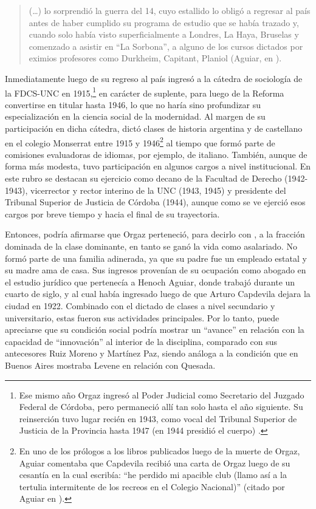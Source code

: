 \begin{quote}
(\dots) lo sorprendió la guerra del 14, cuyo estallido lo obligó a regresar al país antes de haber cumplido su programa de estudio que se había trazado y, cuando solo había visto superficialmente a Londres, La Haya, Bruselas y comenzado a asistir en \enquote{La Sorbona}, a alguno de los cursos dictados por eximios profesores como Durkheim, Capitant, Planiol (Aguiar, en \cite[10]{1544-ORGAZ1960}).
\end{quote}

Inmediatamente luego de su regreso al país ingresó a la cátedra de sociología de la FDCS-UNC en 1915,\footnote{Ese mismo año Orgaz ingresó al Poder Judicial como Secretario del Juzgado Federal de Córdoba, pero permaneció allí tan solo hasta el año siguiente. Su reinserción tuvo lugar recién en 1943, como vocal del Tribunal Superior de Justicia de la Provincia hasta 1947 (en 1944 presidió el cuerpo) \parencite{1528-REQUENA2010}.} en carácter de suplente, para luego de la Reforma convertirse en titular hasta 1946, lo que no haría sino profundizar su especialización en la ciencia social de la modernidad. Al margen de su participación en dicha cátedra, dictó clases de historia argentina y de castellano en el colegio Monserrat entre 1915 y 1946\footnote{En uno de los prólogos a los libros publicados luego de la muerte de Orgaz, Aguiar comentaba que Capdevila recibió una carta de Orgaz luego de su cesantía en la cual escribía: \enquote{he perdido mi apacible club (llamo así a la tertulia intermitente de los recreos en el Colegio Nacional)} (citado por Aguiar en \cite[20]{1545-ORGAZ1950}).} al tiempo que formó parte de comisiones evaluadoras de idiomas, por ejemplo, de italiano. También, aunque de forma más modesta, tuvo participación en algunos cargos a nivel institucional. En este rubro se destacan su ejercicio como decano de la Facultad de Derecho (1942-1943), vicerrector y rector interino de la UNC (1943, 1945) y presidente del Tribunal Superior de Justicia de Córdoba (1944), aunque como se ve ejerció esos cargos por breve tiempo y hacia el final de su trayectoria.

Entonces, podría afirmarse que Orgaz perteneció, para decirlo con \textcite{1576-BOURDIEU1999}, a la fracción dominada de la clase dominante, en tanto se ganó la vida como asalariado. No formó parte de una familia adinerada, ya que su padre fue un empleado estatal y su madre ama de casa. Sus ingresos provenían de su ocupación como abogado en el estudio jurídico que pertenecía a Henoch Aguiar, donde trabajó durante un cuarto de siglo, y al cual había ingresado luego de que Arturo Capdevila dejara la ciudad en 1922. Combinado con el dictado de clases a nivel secundario y universitario, estas fueron sus actividades principales. Por lo tanto, puede apreciarse que su condición social podría mostrar un \enquote{avance} en relación con la capacidad de \enquote{innovación} al interior de la disciplina, comparado con sus antecesores Ruiz Moreno y Martínez Paz, siendo análoga a la condición que en Buenos Aires mostraba Levene en relación con Quesada.

